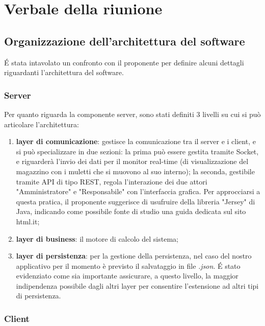 \section{Verbale della riunione}

\subsection {Organizzazione dell'architettura del software}

\'E stata intavolato un confronto con il proponente per definire alcuni dettagli riguardanti l'architettura del software.

\subsubsection{Server}

Per quanto riguarda la componente server, sono stati definiti 3 livelli su cui si può articolare l'architettura:
\begin{enumerate}
	\item \textbf{layer di comunicazione}: gestisce la comunicazione tra il server e i client, e si può specializzare in due sezioni: la prima può essere gestita tramite Socket, e riguarderà l'invio dei dati per il monitor real-time (di visualizzazione del magazzino con i muletti che si muovono al suo interno); la seconda, gestibile tramite API di tipo REST, regola l'interazione dei due attori "Amministratore" e "Responsabile" con l'interfaccia grafica. Per approcciarsi a questa pratica, il proponente suggerisce di usufruire della libreria "Jersey" di Java, indicando come possibile fonte di studio una guida dedicata sul sito html.it;
	\item \textbf{layer di business}: il motore di calcolo del sistema;
	\item \textbf{layer di persistenza}: per la gestione della persistenza, nel caso del nostro applicativo per il momento è previsto il salvataggio in file \textit{.json}. \'E stato evidenziato come sia importante assicurare, a questo livello, la maggior indipendenza possibile dagli altri layer per consentire l'estensione ad altri tipi di persistenza.
\end{enumerate}

\subsubsection{Client}

